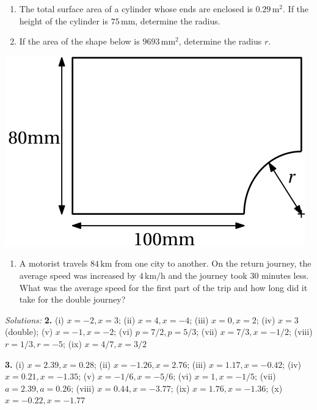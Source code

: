 \documentclass[
  12pt,
  oneside]{book}
\providecommand{\tightlist}{%
  \setlength{\itemsep}{0pt}\setlength{\parskip}{0pt}}
\theoremstyle{definition}
\theoremstyle{definition}
\theoremstyle{definition}
\theoremstyle{definition}
\theoremstyle{remark}
\begin{document}
\begin{enumerate}
\def\labelenumi{\arabic{enumi}.}
\setcounter{enumi}{7}
\item
  The total surface area of a cylinder whose ends are enclosed is \(0.29\,\mathrm{m^2}\). If the height of the cylinder is \(75\,\mathrm{mm}\), determine the radius.
\item
  If the area of the shape below is \(9693\,\mathrm{mm^2}\), determine the radius \(r\).
\end{enumerate}

\begin{center}\includegraphics{t03-shape2} \end{center}

\begin{enumerate}
\def\labelenumi{\arabic{enumi}.}
\setcounter{enumi}{9}
\tightlist
\item
  A motorist travels \(84\,\mathrm{km}\) from one city to another. On the return journey, the average speed was increased by \(4\,\mathrm{km/h}\) and the journey took \(30\) minutes less. What was the average speed for the first part of the trip and how long did it take for the double journey?
\end{enumerate}

\emph{Solutions:}
\textbf{2.} (i) \(x=-2,x=3\); (ii) \(x=4,x=-4\); (iii) \(x=0,x=2\); (iv) \(x=3\) (double); (v) \(x=-1,x=-2\); (vi) \(p=7/2, p=5/3\); (vii) \(x=7/3,x=-1/2\); (viii) \(r=1/3,r=-5\); (ix) \(x=4/7,x=3/2\)

\textbf{3.} (i) \(x=2.39,x=0.28\); (ii) \(x=-1.26,x=2.76\); (iii) \(x=1.17,x=-0.42\); (iv) \(x=0.21,x=-1.35\); (v) \(x=-1/6,x=-5/6\); (vi) \(x=1,x=-1/5\); (vii) \(a=2.39,a=0.26\); (viii) \(x=0.44,x=-3.77\); (ix) \(x=1.76,x=-1.36\); (x) \(x=-0.22,x=-1.77\)
\end{document}
